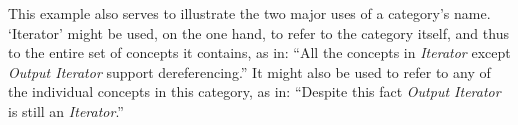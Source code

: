 \documentclass{article}
\begin{document}
This example also serves to
illustrate the two major uses of a category's name. `Iterator' might be used, on the one hand,
to refer to the category itself, and thus to the entire set of concepts it contains, as in:
``All the concepts in \emph{Iterator} except \emph{Output Iterator} support dereferencing.''
It might also be used to refer to any of the individual concepts in this category, as in:
``Despite this fact \emph{Output Iterator} is still an \emph{Iterator}.''
\end{document}
